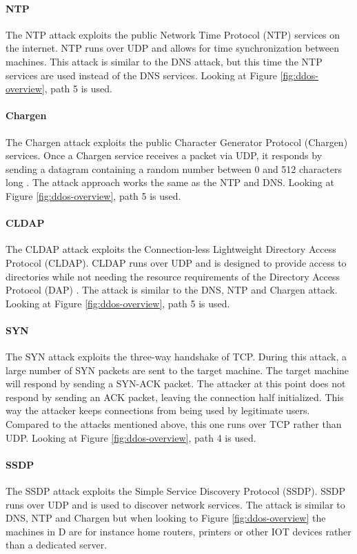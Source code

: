 \paragraph{NTP}
The NTP attack exploits the public Network Time Protocol (NTP) services on the internet. NTP runs over UDP and allows for time synchronization between machines. This attack is similar to the DNS attack, but this time the NTP services are used instead of the DNS services. Looking at Figure \ref{fig:ddos-overview}, path 5 is used.  

\paragraph{Chargen}
The Chargen attack exploits the public Character Generator Protocol (Chargen) services. Once a Chargen service receives a packet via UDP, it responds by sending a datagram containing a random number between 0 and 512 characters long \cite{ietf1983}. The attack approach works the same as the NTP and DNS. Looking at Figure \ref{fig:ddos-overview}, path 5 is used.   

\paragraph{CLDAP}
The CLDAP attack exploits the Connection-less Lightweight Directory Access Protocol (CLDAP). CLDAP runs over UDP and is designed to provide access to directories while not needing the resource requirements of the Directory Access Protocol (DAP) \cite{ietf1995}. The attack is similar to the DNS, NTP and Chargen attack. Looking at Figure \ref{fig:ddos-overview}, path 5 is used.   

\paragraph{SYN}
The SYN attack exploits the three-way handshake of TCP. During this attack, a large number of SYN packets are sent to the target machine. The target machine will respond by sending a SYN-ACK packet. The attacker at this point does not respond by sending an ACK packet, leaving the connection half initialized. This way the attacker keeps connections from being used by legitimate users. Compared to the attacks mentioned above, this one runs over TCP rather than UDP. Looking at Figure \ref{fig:ddos-overview}, path 4 is used. 

\paragraph{SSDP}
The SSDP attack exploits the Simple Service Discovery Protocol (SSDP). SSDP runs over UDP and is used to discover network services. The attack is similar to DNS, NTP and Chargen but when looking to Figure \ref{fig:ddos-overview} the machines in D are for instance home routers, printers or other IOT devices rather than a dedicated server. 


